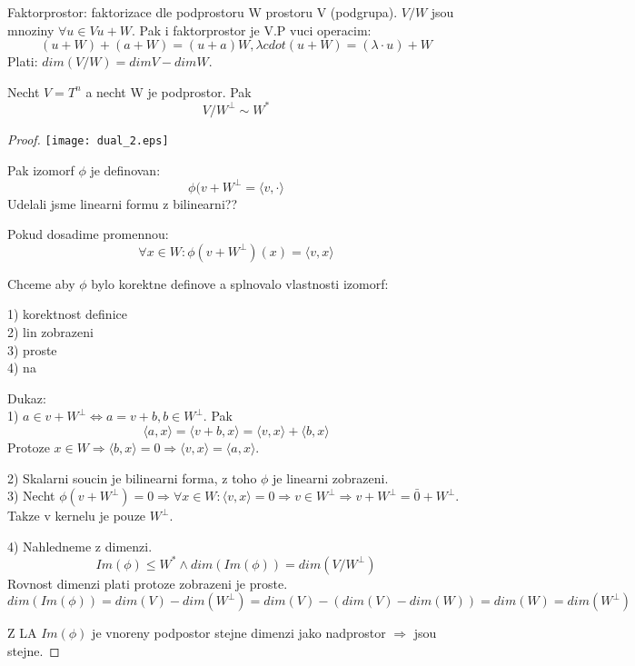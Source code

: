 \begin{definition}
Faktorprostor: faktorizace dle podprostoru W prostoru V (podgrupa). $V/W$ jsou mnoziny $\forall u \in V u + W$. Pak i faktorprostor je V.P vuci operacim:
\[ (u + W) + (a + W) = (u + a)W, \lambda cdot (u + W) = (\lambda \cdot u) + W \]
Plati: $dim(V/W) = dimV - dim W$.
\end{definition}

\begin{theorem}
	Necht $V = T^n$ a necht W je podprostor. Pak
	\[ V/W^{\perp} \sim W^{\ast} \]
\end{theorem}
\begin{proof}
	\texttt{[image: dual\_2.eps]}

	Pak izomorf $\phi$ je definovan:
	\[\phi(v + W^{\perp} = \langle v, \cdot \rangle \]
	Udelali jsme linearni formu z bilinearni??

	Pokud dosadime promennou:
	\[\forall x \in W: \phi(v + W^{\perp})(x) = \langle v, x \rangle \]

	Chceme aby $\phi$ bylo korektne definove a splnovalo vlastnosti izomorf:

	1) korektnost definice \\
	2) lin zobrazeni \\
	3) proste\\
	4) na

	Dukaz:\\
	1) $a \in v + W^{\perp} \iff a = v + b, b \in W^{\perp}$. Pak
	\[ \langle a, x \rangle = \langle v + b, x \rangle = \langle v, x \rangle + \langle b, x \rangle\]
	Protoze $x \in W \Rightarrow \langle b, x \rangle = 0 \Rightarrow \langle v, x \rangle = \langle a, x \rangle $.

	2) Skalarni soucin je bilinearni forma, z toho $\phi$ je linearni zobrazeni.\\
	3) Necht $\phi(v + W^{\perp}) = 0 \Rightarrow \forall x \in W : \langle v, x \rangle = 0 \Rightarrow v \in W^{\perp} \Rightarrow v + W^{\perp} = \bar{0} + W^{\perp}$.
	Takze v kernelu je pouze $W^{\perp}$.

	4) Nahledneme z dimenzi.
	\[ Im(\phi) \leq W^{\ast} \land dim(Im(\phi)) = dim (V/W^{\perp}) \]
	Rovnost dimenzi plati protoze zobrazeni je proste.
	\[ dim(Im(\phi)) = dim(V) - dim(W^{\perp}) = dim(V) - (dim(V) - dim(W)) = dim(W) = dim(W^{\perp}) \]

	Z LA $Im(\phi)$ je vnoreny podpostor stejne dimenzi jako nadprostor $\Rightarrow$ jsou stejne.

\end{proof}

